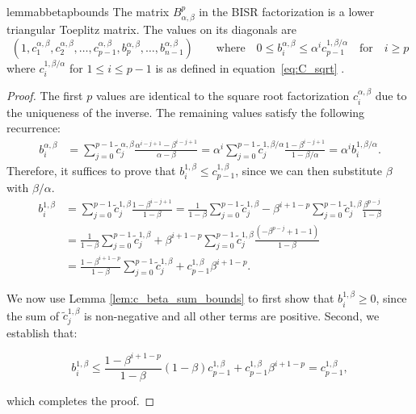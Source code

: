 \documentclass{article} %
\newcommand{\acronym}{BISR\xspace}
\begin{document}
\begin{restatable}{lemma}{bbetapbounds}
\label{lem:b_beta_bounds}
The matrix $B^{p}_{\alpha, \beta}$ in the \acronym factorization is a lower triangular Toeplitz matrix. 
%
The values on its diagonals are
\begin{equation}
    (1, c_1^{\alpha, \beta}, c_2^{\alpha, \beta}, \dots, c_{p - 1}^{\alpha, \beta}, b_{p}^{\alpha, \beta}, \dots, b_{n - 1}^{\alpha, \beta}) \qquad \text{where} \quad 0\leq b_{i}^{\alpha, \beta} \leq \alpha^i c_{p -1}^{1, \beta/\alpha} \quad \text{for} \quad i \geq p
\end{equation}
where $c_{i}^{1,\beta/\alpha}$ for $1\leq i \leq p-1$ is as defined in equation~\eqref{eq:C_sqrt} .
\end{restatable}
\begin{proof}
The first $p$ values are identical to the square root factorization $c_{i}^{\alpha, \beta}$ due to the uniqueness of the inverse. The remaining values satisfy the following recurrence:
\begin{equation}
\begin{aligned}
    b_{i}^{\alpha, \beta} &= \sum\limits_{j = 0}^{p - 1} \tilde{c}_j^{\alpha, \beta} \frac{\alpha^{i - j + 1} - \beta^{i - j+1}}{\alpha - \beta} = \alpha^{i} \sum\limits_{j = 0}^{p - 1} \tilde{c}_j^{1, \beta/\alpha} \frac{1 - \beta^{i - j+1}}{1 - \beta / \alpha} = \alpha^{i} b_{i}^{1, \beta/\alpha}.
\end{aligned}
\end{equation}
Therefore, it suffices to prove that $b_i^{1, \beta} \le c_{p - 1}^{1, \beta}$, since we can then substitute $\beta$ with $\beta/\alpha$.
\begin{equation}
\begin{aligned}
    b_{i}^{1, \beta} &= \sum\limits_{j = 0}^{p - 1} \tilde{c}_j^{1, \beta} \frac{1 - \beta^{i - j+1}}{1 - \beta} = \frac{1}{1 - \beta}\sum\limits_{j = 0}^{p - 1} \tilde{c}_j^{1, \beta} - \beta^{i + 1 - p} \sum\limits_{j = 0}^{p - 1} \tilde{c}_j^{1, \beta} \frac{\beta^{p-j}}{1 - \beta}\\
    &= \frac{1}{1 - \beta}\sum\limits_{j = 0}^{p - 1} \tilde{c}_j^{1, \beta} + \beta^{i + 1 - p} \sum\limits_{j = 0}^{p - 1} \tilde{c}_j^{1, \beta} \frac{(-\beta^{p-j} + 1 - 1)}{1 - \beta}\\
    &= \frac{1 - \beta^{i + 1 - p}}{1 - \beta}\sum\limits_{j = 0}^{p - 1} \tilde{c}_j^{1, \beta} + c_{p - 1}^{1, \beta}\beta^{i + 1 - p}.
\end{aligned}
\end{equation}

We now use Lemma \ref{lem:c_beta_sum_bounds} to first show that $b_i^{1, \beta} \geq 0$, since the sum of $\tilde{c}_j^{1, \beta}$ is non-negative and all other terms are positive. Second, we establish that:

\begin{equation}
    b_{i}^{1, \beta} \leq \frac{1 - \beta^{i + 1 - p}}{1 - \beta}(1 - \beta) c_{p - 1}^{1, \beta} + c_{p - 1}^{1, \beta}\beta^{i + 1 - p} = c_{p - 1}^{1, \beta},
\end{equation}

which completes the proof.
\end{proof}
\end{document}
